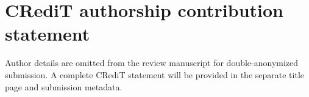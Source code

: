 \section*{CRediT authorship contribution statement}
Author details are omitted from the review manuscript for double-anonymized submission. A complete CRediT statement will be provided in the separate title page and submission metadata.
